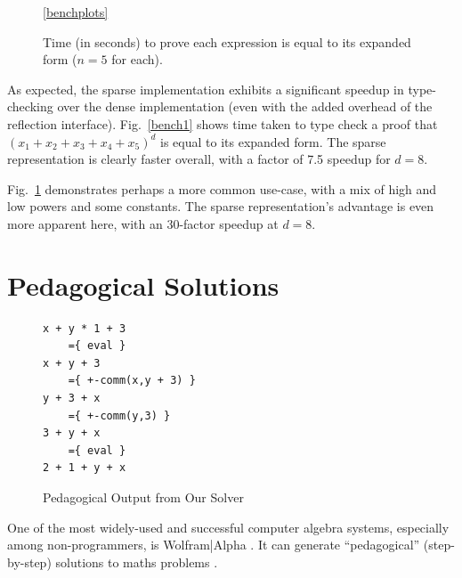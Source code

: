 \documentclass[acmsmall, screen, nonacm, timestamp, review]{acmart}
\theoremstyle{definition}
\theoremstyle{definition}
\begin{document}
\begin{figure}[b]
\begin{subfigure}[t]{0.3\textwidth}
    \label{bench3}
  \end{subfigure}%
  \vspace{-15pt}
  \begin{minipage}{0.23\textwidth}
  \ref{benchplots}
  \end{minipage}%
  \begin{minipage}{0.67\textwidth}
  \caption{Time (in seconds) to prove each expression is equal to its expanded
    form ($n = 5$ for each).}
  \end{minipage}
  \label{benchmarks}
  \vspace{-10pt}
\end{figure}
As expected, the sparse implementation exhibits a significant speedup in
type-checking over the dense implementation (even with the added overhead of the
reflection interface). Fig.~\ref{bench1} shows time taken to type check a proof
that \((x_1 + x_2 + x_3 + x_4 + x_5)^d\) is equal to its expanded form. The
sparse representation is clearly faster overall, with a factor of 7.5 speedup
for \(d = 8\).

Fig.~\ref{bench3} demonstrates perhaps a more common use-case, with a mix of
high and low powers and some constants. The sparse representation's advantage is
even more apparent here, with an \(30\)-factor speedup at \(d = 8\).
\section{Pedagogical Solutions}
\begin{figure}
\vspace{-10pt}
\begin{BVerbatim}
x + y * 1 + 3
    ={ eval }
x + y + 3
    ={ +-comm(x,y + 3) }
y + 3 + x
    ={ +-comm(y,3) }
3 + y + x
    ={ eval }
2 + 1 + y + x
\end{BVerbatim}
\caption{Pedagogical Output from Our Solver}
\label{steps}
\vspace{-10pt}
\end{figure}
One of the most widely-used and successful computer algebra systems, especially
among non-programmers, is Wolfram|Alpha
\cite{wolfram_research_inc._wolframalpha_2019}. It can generate ``pedagogical''
(step-by-step) solutions to maths
problems \cite{the_development_team_step-by-step_2009}.
\end{document}
